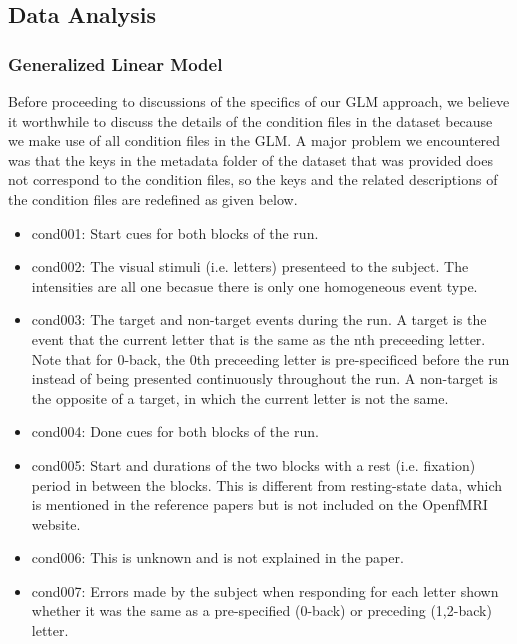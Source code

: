\documentclass[11pt]{article}
\begin{document}
\subsection{Data Analysis}

\subsubsection{Generalized Linear Model}

Before proceeding to discussions of the specifics of our GLM approach, we believe it worthwhile to discuss the details of the condition files in the dataset because we make use of all condition files in the GLM. A major problem we encountered was that the keys in the metadata folder of the dataset that was provided does not correspond to the condition files, so the keys and the related descriptions of the condition files are redefined as given below. 

\begin{itemize}

\item cond001: Start cues for both blocks of the run.

\item cond002: The visual stimuli (i.e. letters) presenteed to the subject. The
intensities are all one becasue there is only one homogeneous event type.

\item cond003: The target and non-target events during the run. A target is the event
that the current letter that is the same as the nth preceeding letter. Note that
for 0-back, the 0th preceeding letter is pre-specificed before the run instead
of being presented continuously throughout the run. A non-target is the opposite
of a target, in which the current letter is not the same. 

\item cond004: Done cues for both blocks of the run.

\item cond005: Start and durations of the two blocks with a rest (i.e. fixation)
period in between the blocks. This is different from resting-state data, which
is mentioned in the reference papers but is not included on the OpenfMRI
website. 

\item cond006: This is unknown and is not explained in the paper.

\item cond007: Errors made by the subject when responding for each letter shown
whether it was the same as a pre-specified (0-back) or preceding (1,2-back)
letter.

\end{itemize}
\end{document}
